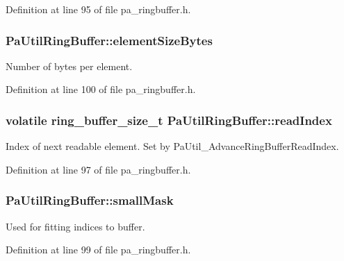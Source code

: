 Definition at line 95 of file pa\+\_\+ringbuffer.\+h.

\subsubsection[{\texorpdfstring{element\+Size\+Bytes}{elementSizeBytes}}]{ Pa\+Util\+Ring\+Buffer\+::element\+Size\+Bytes}\hypertarget{struct_pa_util_ring_buffer_a5a7585b4f9929cb74e2fcf6d0e0be072}{}\label{struct_pa_util_ring_buffer_a5a7585b4f9929cb74e2fcf6d0e0be072}
Number of bytes per element. 

Definition at line 100 of file pa\+\_\+ringbuffer.\+h.

\subsubsection[{\texorpdfstring{read\+Index}{readIndex}}]{\setlength{\rightskip}{0pt plus 5cm}volatile {\bf ring\+\_\+buffer\+\_\+size\+\_\+t} Pa\+Util\+Ring\+Buffer\+::read\+Index}\hypertarget{struct_pa_util_ring_buffer_aae25b99beddc44ae0efe8ae2ef341401}{}\label{struct_pa_util_ring_buffer_aae25b99beddc44ae0efe8ae2ef341401}
Index of next readable element. Set by Pa\+Util\+\_\+\+Advance\+Ring\+Buffer\+Read\+Index. 

Definition at line 97 of file pa\+\_\+ringbuffer.\+h.

\subsubsection[{\texorpdfstring{small\+Mask}{smallMask}}]{ Pa\+Util\+Ring\+Buffer\+::small\+Mask}\hypertarget{struct_pa_util_ring_buffer_a852c77d20c925439882cdb4dc9d1c0c9}{}\label{struct_pa_util_ring_buffer_a852c77d20c925439882cdb4dc9d1c0c9}
Used for fitting indices to buffer. 

Definition at line 99 of file pa\+\_\+ringbuffer.\+h.

